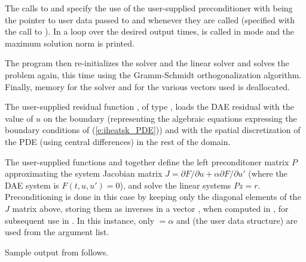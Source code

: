 The calls to  and 
specify the use of the user-supplied preconditioner with 
being the pointer to user data passed to  and  
whenever they are called (specified with the call to ).
In a loop over the desired output times,  is called in 
mode and the maximum solution norm is printed.

The  program then re-initializes the {\ida} solver and the
{\idaspgmr} linear solver and solves the problem again, this time
using the  Gramm-Schmidt orthogonalization algorithm.
Finally, memory for the {\ida} solver and for the various vectors used is deallocated.

The user-supplied residual function , of type ,
loads the DAE residual with the value of $u$ on the boundary
(representing the algebraic equations expressing the boundary
conditions of (\ref{e:iheatsk_PDE})) and with the spatial discretization 
of the PDE (using central differences) in the rest of the domain.

The user-supplied functions  and  together define the 
left preconditoner matrix $P$ approximating the system Jacobian matrix
$J = \partial F/ \partial u + \alpha \partial F/ \partial u'$ (where the DAE
system is $F(t,u,u') = 0$), and solve the linear systems $P z = r$.   
Preconditioning  is done in this case by keeping only the diagonal elements of 
the $J$ matrix above, storing them as inverses in a vector , when computed
in , for subsequent use in .
In this instance, only  $=\alpha$ and  (the user data
structure) are used from the  argument list.

Sample output from  follows.
